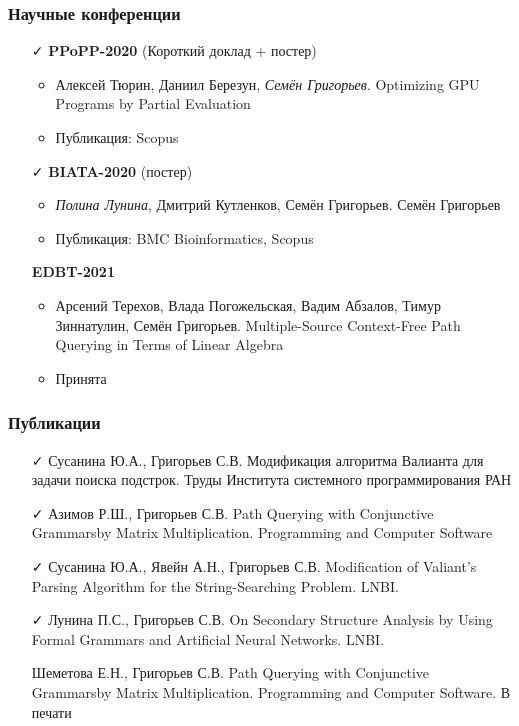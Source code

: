 \documentclass[xcolor=table]{beamer}
\begin{document}
\begin{frame}[fragile]

  \frametitle{Научные конференции}
      \begin{itemize}

      \item[\faCheck] \textbf{PPoPP-2020} (Короткий доклад + постер)
      \begin{itemize}
        \item Алексей Тюрин, Даниил Березун, \emph{Семён Григорьев}. Optimizing GPU Programs by Partial Evaluation
        \item Публикация: Scopus
      \end{itemize}

      \item[\faCheck] \textbf{BIATA-2020} (постер)
      \begin{itemize}
         \item \emph{Полина Лунина}, Дмитрий Кутленков, Семён Григорьев. Семён Григорьев
         \item Публикация: BMC Bioinformatics, Scopus
      \end{itemize}

      \item[\faHourglassHalf] \textbf{EDBT-2021} 
      \begin{itemize}
        \item Арсений Терехов, Влада Погожельская, Вадим Абзалов, Тимур Зиннатулин, Семён Григорьев. Multiple-Source Context-Free Path Querying in Terms of Linear Algebra
        \item Принята
      \end{itemize}

\end{itemize}
\end{frame}


\begin{frame}[fragile]

  \frametitle{Публикации}
\begin{itemize}
      \item[\faCheck] Сусанина Ю.А., Григорьев С.В. Модификация алгоритма Валианта для задачи поиска подстрок. Труды Института системного программирования РАН
      \item[\faCheck] Азимов Р.Ш., Григорьев С.В. Path Querying with Conjunctive Grammarsby Matrix Multiplication. Programming and Computer Software
      \item[\faCheck] Сусанина Ю.А., Явейн А.Н., Григорьев С.В. Modification of Valiant’s Parsing Algorithm for the String-Searching Problem. LNBI.
      \item[\faCheck] Лунина П.С., Григорьев С.В. On Secondary Structure Analysis by Using Formal Grammars and Artificial Neural Networks. LNBI.
      \item[\faHourglassHalf] Шеметова Е.Н., Григорьев С.В. Path Querying with Conjunctive Grammarsby Matrix Multiplication. Programming and Computer Software. В печати
      
\end{itemize}
\end{frame}
\end{document}
